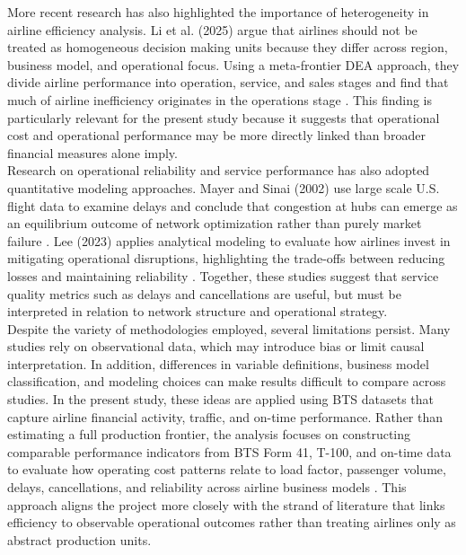 \documentclass[11pt, letterpaper]{article}
\begin{document}
\indent More recent research has also highlighted the importance of heterogeneity in airline efficiency analysis. Li et al. (2025) argue that airlines should not be treated as homogeneous decision making units because they differ across region, business model, and operational focus. Using a meta-frontier DEA approach, they divide airline performance into operation, service, and sales stages and find that much of airline inefficiency originates in the operations stage \cite{Li2025}. This finding is particularly relevant for the present study because it suggests that operational cost and operational performance may be more directly linked than broader financial measures alone imply.\\
\indent Research on operational reliability and service performance has also adopted quantitative modeling approaches. Mayer and Sinai (2002) use large scale U.S. flight data to examine delays and conclude that congestion at hubs can emerge as an equilibrium outcome of network optimization rather than purely market failure \cite{MayerSinai2002}. Lee (2023) applies analytical modeling to evaluate how airlines invest in mitigating operational disruptions, highlighting the trade-offs between reducing losses and maintaining reliability \cite{Lee2023}. Together, these studies suggest that service quality metrics such as delays and cancellations are useful, but must be interpreted in relation to network structure and operational strategy.\\
\indent Despite the variety of methodologies employed, several limitations persist. Many studies rely on observational data, which may introduce bias or limit causal interpretation. In addition, differences in variable definitions, business model classification, and modeling choices can make results difficult to compare across studies. In the present study, these ideas are applied using BTS datasets that capture airline financial activity, traffic, and on-time performance. Rather than estimating a full production frontier, the analysis focuses on constructing comparable performance indicators from BTS Form 41, T-100, and on-time data to evaluate how operating cost patterns relate to load factor, passenger volume, delays, cancellations, and reliability across airline business models \cite{bts_ontime, bts_transtats}. This approach aligns the project more closely with the strand of literature that links efficiency to observable operational outcomes rather than treating airlines only as abstract production units. 
\end{document}
